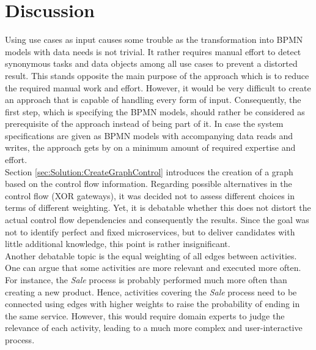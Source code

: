 \endgroup
\vspace{0.5cm}


\section{Discussion}
Using use cases as input causes some trouble as the transformation into BPMN models with data needs is not trivial. It rather requires manual effort to detect synonymous tasks and data objects among all use cases to prevent a distorted result. This stands opposite the main purpose of the approach which is to reduce the required manual work and effort. However, it would be very difficult to create an approach that is capable of handling every form of input. Consequently, the first step, which is specifying the BPMN models, should rather be considered as prerequisite of the approach instead of being part of it. In case the system specifications are given as BPMN models with accompanying data reads and writes, the approach gets by on a minimum amount of required expertise and effort. \\
Section \ref{sec:Solution:CreateGraphControl} introduces the creation of a graph based on the control flow information. Regarding possible alternatives in the control flow (XOR gateways), it was decided not to assess different choices in terms of different weighting. Yet, it is debatable whether this does not distort the actual control flow dependencies and consequently the results. Since the goal was not to identify perfect and fixed microservices, but to deliver candidates with little additional knowledge, this point is rather insignificant. \\
Another debatable topic is the equal weighting of all edges between activities. One can argue that some activities are more relevant and executed more often. For instance, the \textit{Sale} process is probably performed much more often than creating a new product. Hence, activities covering the \textit{Sale} process need to be connected using edges with higher weights to raise the probability of ending in the same service. However, this would require domain experts to judge the relevance of each activity, leading to a much more complex and user-interactive process. \\ 
